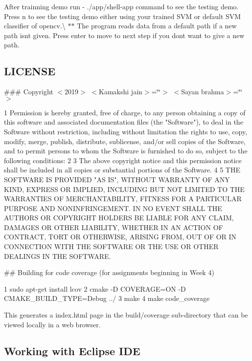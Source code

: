 After trainning demo run -\/ ./app/shell-\/app command to see the testing demo. Press \textquotesingle{}n\textquotesingle{} to see the testing demo either using your trained S\+VM or default S\+VM classifier of opencv.\textbackslash{} $\ast$$\ast$ The program reads data from a default path if a new path isnt given. Press enter to move to next step if you dont want to give a new path.

\subsection*{L\+I\+C\+E\+N\+SE}

\#\#\# Copyright $<$2019$>$ $<$\+Kamakshi jain$>$=\char`\"{}\char`\"{}$>$ $<$\+Sayan brahma$>$=\char`\"{}\char`\"{}$>$ 
\begin{DoxyCode}
1 Permission is hereby granted, free of charge, to any person obtaining a copy of this software and
       associated documentation files (the "Software"), to deal in the Software without restriction, including without
       limitation the rights to use, copy, modify, merge, publish, distribute, sublicense, and/or sell copies of the
       Software, and to permit persons to whom the Software is furnished to do so, subject to the following
       conditions:
2 
3 The above copyright notice and this permission notice shall be included in all copies or substantial
       portions of the Software.
4 
5 THE SOFTWARE IS PROVIDED "AS IS", WITHOUT WARRANTY OF ANY KIND, EXPRESS OR IMPLIED, INCLUDING BUT NOT
       LIMITED TO THE WARRANTIES OF MERCHANTABILITY, FITNESS FOR A PARTICULAR PURPOSE AND NONINFRINGEMENT. IN NO EVENT
       SHALL THE AUTHORS OR COPYRIGHT HOLDERS BE LIABLE FOR ANY CLAIM, DAMAGES OR OTHER LIABILITY, WHETHER IN AN
       ACTION OF CONTRACT, TORT OR OTHERWISE, ARISING FROM, OUT OF OR IN CONNECTION WITH THE SOFTWARE OR THE USE OR
       OTHER DEALINGS IN THE SOFTWARE.
\end{DoxyCode}


\#\# Building for code coverage (for assignments beginning in Week 4) 
\begin{DoxyCode}
1 sudo apt-get install lcov
2 cmake -D COVERAGE=ON -D CMAKE\_BUILD\_TYPE=Debug ../
3 make
4 make code\_coverage
\end{DoxyCode}
 This generates a index.\+html page in the build/coverage sub-\/directory that can be viewed locally in a web browser.

\subsection*{Working with Eclipse I\+DE}

